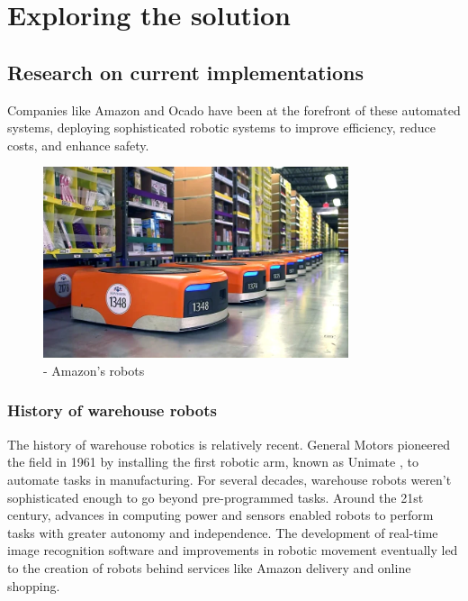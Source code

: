 
\chapter{Exploring the solution}

\section{Research on current implementations}

Companies like Amazon and Ocado have been at the forefront of these automated systems, deploying sophisticated robotic systems to improve efficiency, reduce costs, and enhance safety.

\begin{figure}[h!] 
\centering    
\includegraphics[width=0.8\textwidth]{Images/kiva.png}
\caption{- Amazon's robots \cite{amazonrobotics_2024_closeup}}
\label{robot}
\end{figure}

\subsection{History of warehouse robots}

The history of warehouse robotics is relatively recent. General Motors pioneered the field in 1961 by installing the first robotic arm, known as Unimate \cite{a2024_joseph}, to automate tasks in manufacturing. For several decades, warehouse robots weren't sophisticated enough to go beyond pre-programmed tasks. Around the 21st century, advances in computing power and sensors enabled robots to perform tasks with greater autonomy and independence. The development of real-time image recognition software and improvements in robotic movement eventually led to the creation of robots behind services like Amazon delivery and online shopping.

